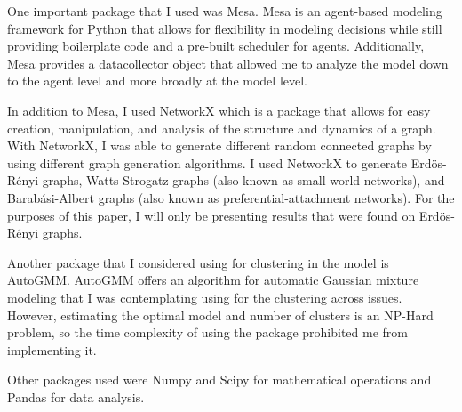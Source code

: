 One important package that I used was Mesa. Mesa is an agent-based modeling framework for Python that allows for flexibility in modeling decisions while still providing boilerplate code and a pre-built scheduler for agents. Additionally, Mesa provides a datacollector object that allowed me to analyze the model down to the agent level and more broadly at the model level. 

In addition to Mesa, I used NetworkX which is a package that allows for easy creation, manipulation, and analysis of the structure and dynamics of a graph. With NetworkX, I was able to generate different random connected graphs by using different graph generation algorithms. I used NetworkX to generate Erd\"{o}s-R\'{e}nyi graphs, Watts-Strogatz graphs (also known as small-world networks), and Barab\'{a}si-Albert graphs (also known as preferential-attachment networks). For the purposes of this paper, I will only be presenting results that were found on Erd\"{o}s-R\'{e}nyi graphs. 

Another package that I considered using for clustering in the model is AutoGMM. AutoGMM offers an algorithm for automatic Gaussian mixture modeling that I was contemplating using for the clustering across issues. However, estimating the optimal model and number of clusters is an NP-Hard problem, so the time complexity of using the package prohibited me from implementing it. 

Other packages used were Numpy and Scipy for mathematical operations and Pandas for data analysis. 
